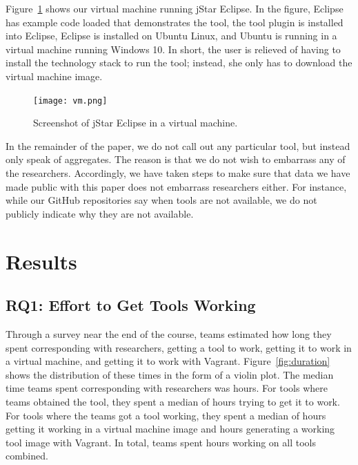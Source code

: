 \documentclass[10pt,conference]{IEEEtran}
\begin{document}
Figure~\ref{fig:vm} shows our virtual machine running 
jStar Eclipse.
In the figure, 
Eclipse has example code loaded that demonstrates
the tool, 
the tool plugin is installed into Eclipse,
Eclipse is installed on Ubuntu Linux,
and Ubuntu is running in a virtual machine
running Windows 10. 
In short, the user is relieved of having to install
the technology stack to run the tool; instead, 
she only has to download the virtual machine image.

\begin{figure}[t]
  \centering
    \texttt{[image: vm.png]}
  \caption{Screenshot of jStar Eclipse in a virtual machine.}\label{fig:vm}
\end{figure}

In the remainder of the paper, we do not call out 
any particular tool, but instead only speak of aggregates.
The reason is that we do not wish to embarrass any of the researchers.
Accordingly, we have taken steps to make sure that data we have made 
public with this paper does not embarrass researchers either.
For instance, while our GitHub repositories say when tools are 
not available, we do not publicly indicate why they are
not available.

\section{Results}

\subsection{RQ1: Effort to Get Tools Working}

Through a survey near the end of the course, 
teams estimated how long they spent
corresponding with researchers,
getting a tool to work,
getting it to work in a virtual machine,
and getting it to work with Vagrant.
Figure~\ref{fig:duration} shows the distribution of
these times in the form of a violin plot.
The median time teams spent corresponding with
researchers was \durationCorresponding hours.
For tools where teams obtained the tool,
they spent a median of \durationWorking hours
trying to get it to work.
For tools where the teams got a tool working,
they spent a median of \durationVM hours getting it working 
in a virtual machine image and
\durationVagrant hours generating a working tool
image with Vagrant.
In total, teams spent \durationTotal hours working
on all tools combined.
\end{document}
